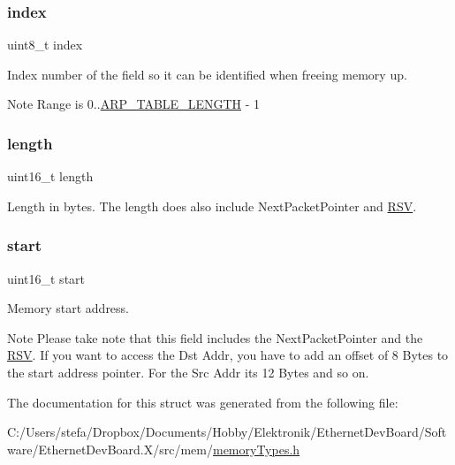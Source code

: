 \subsubsection{\texorpdfstring{index}{index}}
{\footnotesize\ttfamily uint8\+\_\+t index}



Index number of the field so it can be identified when freeing memory up. 

\begin{DoxyNote}{Note}
Range is 0..\mbox{\hyperlink{group__arp_gad4abd9ee89fa8a8ba4231b6d914b5e83}{A\+R\+P\+\_\+\+T\+A\+B\+L\+E\+\_\+\+L\+E\+N\+G\+TH}} -\/ 1 
\end{DoxyNote}
\mbox{\label{structmemory_field_a1892eba2086d12ac2b09005aeb09ea3b}} 
\subsubsection{\texorpdfstring{length}{length}}
{\footnotesize\ttfamily uint16\+\_\+t length}



Length in bytes. The length does also include Next\+Packet\+Pointer and \mbox{\hyperlink{struct_r_s_v}{R\+SV}}. 

\mbox{\label{structmemory_field_a171a2b5d11b1a5891c38a98ac731a161}} 
\subsubsection{\texorpdfstring{start}{start}}
{\footnotesize\ttfamily uint16\+\_\+t start}



Memory start address. 

\begin{DoxyNote}{Note}
Please take note that this field includes the Next\+Packet\+Pointer and the \mbox{\hyperlink{struct_r_s_v}{R\+SV}}. If you want to access the Dst Addr, you have to add an offset of 8 Bytes to the start address pointer. For the Src Addr it\textquotesingle{}s 12 Bytes and so on. 
\end{DoxyNote}


The documentation for this struct was generated from the following file\+:\begin{DoxyCompactItemize}
\item 
C\+:/\+Users/stefa/\+Dropbox/\+Documents/\+Hobby/\+Elektronik/\+Ethernet\+Dev\+Board/\+Software/\+Ethernet\+Dev\+Board.\+X/src/mem/\mbox{\hyperlink{memory_types_8h}{memory\+Types.\+h}}\end{DoxyCompactItemize}
